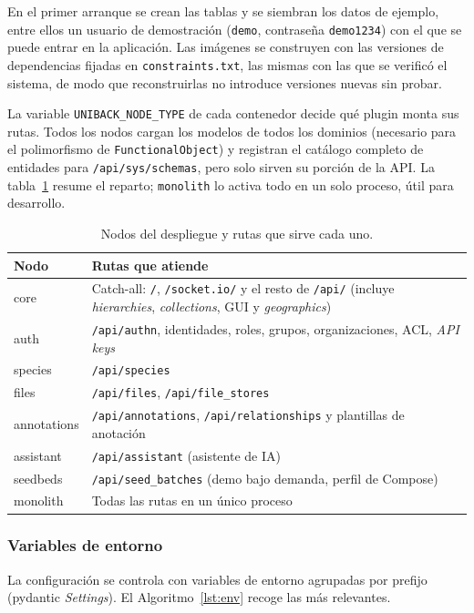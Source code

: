 En el primer arranque se crean las tablas y se siembran los datos de ejemplo,
entre ellos un usuario de demostración (\texttt{demo}, contraseña
\texttt{demo1234}) con el que se puede entrar en la aplicación. Las imágenes se
construyen con las versiones de dependencias fijadas en
\texttt{constraints.txt}, las mismas con las que se verificó el sistema, de
modo que reconstruirlas no introduce versiones nuevas sin probar.

La variable \texttt{UNIBACK\_\allowbreak NODE\_\allowbreak TYPE} de cada
contenedor decide qué \gls{plugin} monta sus rutas. Todos los nodos cargan los
modelos de todos los dominios (necesario para el polimorfismo de
\texttt{FunctionalObject}) y registran el catálogo completo de entidades para
\texttt{/api/sys/schemas}, pero solo sirven su porción de la API. La
tabla~\ref{tab:nodes} resume el reparto; \texttt{monolith} lo activa todo en un
solo proceso, útil para desarrollo.

\begin{table}[!htbp]
\caption{Nodos del despliegue y rutas que sirve cada uno.}
\label{tab:nodes}
\centering
\begin{tabular}{|p{3cm}|p{11.5cm}|}
\hline
\textbf{Nodo} & \textbf{Rutas que atiende} \\ \hline
core & Catch-all: \texttt{/}, \texttt{/socket.io/} y el resto de \texttt{/api/} (incluye \emph{hierarchies}, \emph{collections}, GUI y \emph{geographics}) \\ \hline
auth & \texttt{/api/authn}, identidades, roles, grupos, organizaciones, ACL, \emph{API keys} \\ \hline
species & \texttt{/api/species} \\ \hline
files & \texttt{/api/files}, \texttt{/api/file\_stores} \\ \hline
annotations & \texttt{/api/annotations}, \texttt{/api/relationships} y plantillas de anotación \\ \hline
assistant & \texttt{/api/assistant} (asistente de IA) \\ \hline
seedbeds & \texttt{/api/seed\_batches} (demo bajo demanda, perfil de Compose) \\ \hline
monolith & Todas las rutas en un único proceso \\ \hline
\end{tabular}
\end{table}

\subsubsection{Variables de entorno}
La configuración se controla con variables de entorno agrupadas por prefijo
(\gls{pydantic} \emph{Settings}). El Algoritmo~\ref{lst:env} recoge las más
relevantes.

